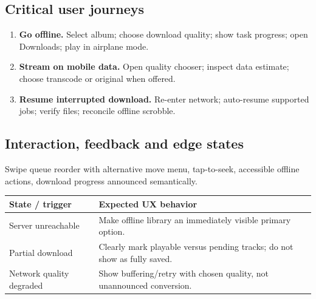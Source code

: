 \documentclass[10pt,a4paper,oneside]{report}
\begin{document}
\subsection*{Critical user journeys}
\begin{enumerate}[leftmargin=*,itemsep=3pt,topsep=2pt]
\item \textbf{Go offline.} Select album; choose download quality; show task progress; open Downloads; play in airplane mode.
\item \textbf{Stream on mobile data.} Open quality chooser; inspect data estimate; choose transcode or original when offered.
\item \textbf{Resume interrupted download.} Re-enter network; auto-resume supported jobs; verify files; reconcile offline scrobble.
\end{enumerate}
\subsection*{Interaction, feedback and edge states}
Swipe queue reorder with alternative move menu, tap-to-seek, accessible offline actions, download progress announced semantically.\par
\begin{tabularx}{\linewidth}{@{}p{39mm}X@{}}\toprule State / trigger & Expected UX behavior\\\midrule
Server unreachable & Make offline library an immediately visible primary option.\\
Partial download & Clearly mark playable versus pending tracks; do not show as fully saved.\\
Network quality degraded & Show buffering/retry with chosen quality, not unannounced conversion.\\
\bottomrule\end{tabularx}
\end{document}
